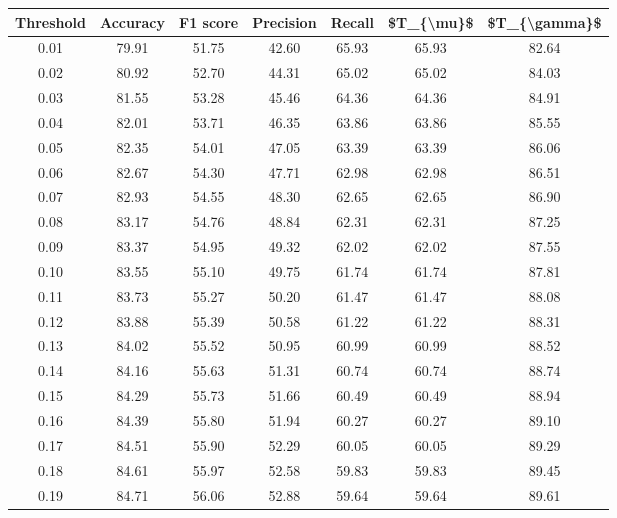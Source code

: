 \begin{tabular}{|c|c|c|c|c|c|c|}
\hline
 Threshold &  Accuracy &  F1 score &  Precision &  Recall &  \$T\_\{\textbackslash mu\}\$ &  \$T\_\{\textbackslash gamma\}\$ \\
\hline
      0.01 &     79.91 &     51.75 &      42.60 &   65.93 &      65.93 &         82.64 \\
      0.02 &     80.92 &     52.70 &      44.31 &   65.02 &      65.02 &         84.03 \\
      0.03 &     81.55 &     53.28 &      45.46 &   64.36 &      64.36 &         84.91 \\
      0.04 &     82.01 &     53.71 &      46.35 &   63.86 &      63.86 &         85.55 \\
      0.05 &     82.35 &     54.01 &      47.05 &   63.39 &      63.39 &         86.06 \\
      0.06 &     82.67 &     54.30 &      47.71 &   62.98 &      62.98 &         86.51 \\
      0.07 &     82.93 &     54.55 &      48.30 &   62.65 &      62.65 &         86.90 \\
      0.08 &     83.17 &     54.76 &      48.84 &   62.31 &      62.31 &         87.25 \\
      0.09 &     83.37 &     54.95 &      49.32 &   62.02 &      62.02 &         87.55 \\
      0.10 &     83.55 &     55.10 &      49.75 &   61.74 &      61.74 &         87.81 \\
      0.11 &     83.73 &     55.27 &      50.20 &   61.47 &      61.47 &         88.08 \\
      0.12 &     83.88 &     55.39 &      50.58 &   61.22 &      61.22 &         88.31 \\
      0.13 &     84.02 &     55.52 &      50.95 &   60.99 &      60.99 &         88.52 \\
      0.14 &     84.16 &     55.63 &      51.31 &   60.74 &      60.74 &         88.74 \\
      0.15 &     84.29 &     55.73 &      51.66 &   60.49 &      60.49 &         88.94 \\
      0.16 &     84.39 &     55.80 &      51.94 &   60.27 &      60.27 &         89.10 \\
      0.17 &     84.51 &     55.90 &      52.29 &   60.05 &      60.05 &         89.29 \\
      0.18 &     84.61 &     55.97 &      52.58 &   59.83 &      59.83 &         89.45 \\
      0.19 &     84.71 &     56.06 &      52.88 &   59.64 &      59.64 &         89.61 \\

\end{tabular}
